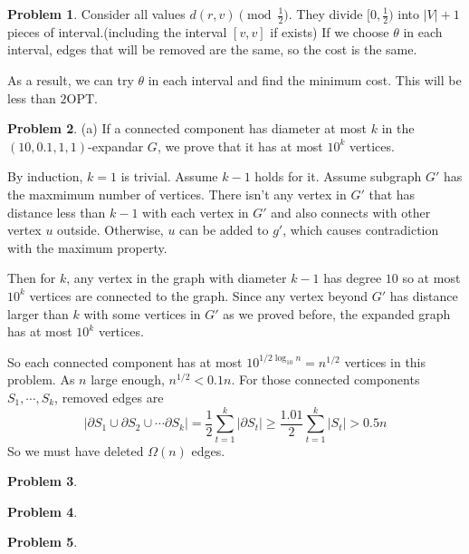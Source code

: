 \documentclass[a4paper]{article}
\theoremstyle{definition}
\newtheorem{problem}{Problem}
\theoremstyle{plain}
\newcommand{\<}{\left<}
\renewcommand{\>}{\right>}
\newcommand{\OPT}{\mathrm{OPT}}
\numberwithin{equation}{problem}
\begin{document}
\begin{problem}
  Consider all values  $ d(r,v)\pmod {\frac{1}{2}} $. They divide  $ [0,\frac{1}{2}) $ into  $ |V|+1 $ pieces of interval.(including the interval  $ [v,v] $ if exists) If we choose  $ \theta $ in each interval, edges that will be removed are the same, so the cost is the same.
  
  As a result, we can try  $ \theta $ in each interval and find the minimum cost. This will be less than  $ 2\OPT $.  
\end{problem}
\begin{problem}
  (a) If a connected component has diameter at most  $ k $ in the  $ (10,0.1,1,1) $-expandar  $ G $, we prove that it has at most  $ 10^k $ vertices.
  
  By induction,  $ k=1 $ is trivial. Assume  $ k-1 $ holds for it. Assume subgraph  $ G' $ has the maxmimum number of vertices. There isn't any vertex in  $ G' $ that has distance less than  $ k-1 $ with each vertex  in $ G' $ and also connects with other vertex $ u $  outside. Otherwise,  $ u $ can be added to  $ g' $, which causes contradiction with the maximum property.
  
  Then for  $ k $, any vertex in the graph with diameter  $ k-1 $ has degree  $ 10 $ so at most  $ 10^k $ vertices are connected to the graph. Since  any vertex beyond  $ G' $ has distance larger than  $ k $ with   some vertices in  $ G' $  as we proved before, the expanded graph has at most  $ 10^k $ vertices.
  
  So each connected component has at most  $ 10^{1/2\log_{10}n}=n^{1/2} $ vertices in this problem.
  As  $ n $ large enough,  $ n^{1/2}<0.1n $. For those connected components  $ S_1,\cdots,S_k $, removed edges are 
  \[|\partial S_1\cup \partial S_2\cup\cdots\partial S_k|=\frac{1}{2}\sum_{t=1}^k|\partial S_t| \geq \frac{1.01}{2}\sum_{t=1}^k|S_t|>0.5 n\]
  So we must have deleted  $ \Omega(n) $ edges.     
\end{problem}
\begin{problem}
  
\end{problem}
\begin{problem}
  
\end{problem}
\begin{problem}
  
\end{problem}
\end{document}
